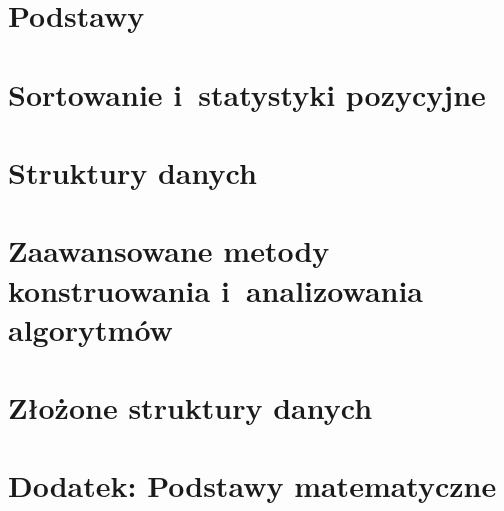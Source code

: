 \documentclass[a4paper,10pt,twoside,openany,titlepage]{book}
\begin{document}
\frontmatter


\ifpdf
\fi

\tableofcontents

\mainmatter

\part{Podstawy}







\part{Sortowanie i~statystyki pozycyjne}






\part{Struktury danych}







\part{Zaawansowane metody konstruowania i~analizowania algorytmów}





\part{Złożone struktury danych}



\setcounter{part}{7}
\part{Dodatek: Podstawy matematyczne}

\appendix





\backmatter

\let\chapter=\originalchapter



\nocite{*}
\end{document}
